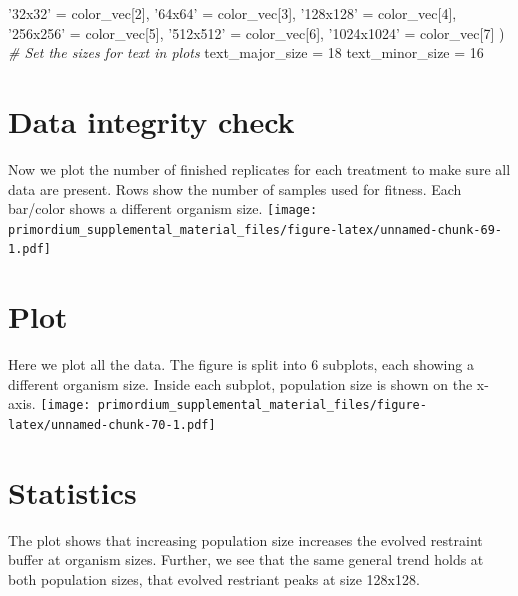 \documentclass[]{book}
\newenvironment{Shaded}{\begin{snugshade}}{\end{snugshade}}
\newcommand{\CommentTok}[1]{\textcolor[rgb]{0.56,0.35,0.01}{\textit{#1}}}
\newcommand{\DecValTok}[1]{\textcolor[rgb]{0.00,0.00,0.81}{#1}}
\newcommand{\NormalTok}[1]{#1}
\newcommand{\StringTok}[1]{\textcolor[rgb]{0.31,0.60,0.02}{#1}}
\begin{document}
\begin{Shaded}
\begin{Highlighting}[]
  \StringTok{'32x32'}\NormalTok{ =}\StringTok{     }\NormalTok{color_vec[}\DecValTok{2}\NormalTok{],}
  \StringTok{'64x64'}\NormalTok{ =}\StringTok{     }\NormalTok{color_vec[}\DecValTok{3}\NormalTok{],}
  \StringTok{'128x128'}\NormalTok{ =}\StringTok{   }\NormalTok{color_vec[}\DecValTok{4}\NormalTok{],}
  \StringTok{'256x256'}\NormalTok{ =}\StringTok{   }\NormalTok{color_vec[}\DecValTok{5}\NormalTok{],}
  \StringTok{'512x512'}\NormalTok{ =}\StringTok{   }\NormalTok{color_vec[}\DecValTok{6}\NormalTok{],}
  \StringTok{'1024x1024'}\NormalTok{ =}\StringTok{ }\NormalTok{color_vec[}\DecValTok{7}\NormalTok{]}
\NormalTok{)}
\CommentTok{# Set the sizes for text in plots}
\NormalTok{text_major_size =}\StringTok{ }\DecValTok{18}
\NormalTok{text_minor_size =}\StringTok{ }\DecValTok{16} 
\end{Highlighting}
\end{Shaded}

\hypertarget{data-integrity-check-4}{%
\section{Data integrity check}\label{data-integrity-check-4}}

Now we plot the number of finished replicates for each treatment to make sure all data are present.
Rows show the number of samples used for fitness.
Each bar/color shows a different organism size.
\texttt{[image: primordium\_supplemental\_material\_files/figure-latex/unnamed-chunk-69-1.pdf]}

\hypertarget{plot-1}{%
\section{Plot}\label{plot-1}}

Here we plot all the data.
The figure is split into 6 subplots, each showing a different organism size.
Inside each subplot, population size is shown on the x-axis.
\texttt{[image: primordium\_supplemental\_material\_files/figure-latex/unnamed-chunk-70-1.pdf]}

\hypertarget{statistics-4}{%
\section{Statistics}\label{statistics-4}}

The plot shows that increasing population size increases the evolved restraint buffer at organism sizes.
Further, we see that the same general trend holds at both population sizes, that evolved restriant peaks at size 128x128.
\end{document}
